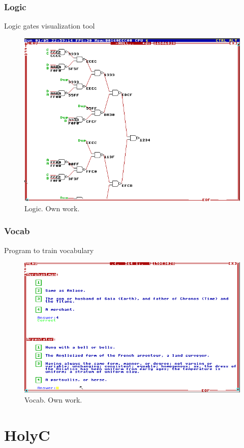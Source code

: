 \documentclass{beamer}
\begin{document}
	\begin{frame}
		\frametitle{Logic}
		Logic gates visualization tool
		\begin{figure}
			\centering
			\includegraphics[width=0.6\linewidth]{images/logic.png}
			\caption{Logic. Own work.}
			\label{fig:logic}
		\end{figure}
	\end{frame}

	\begin{frame}
		\frametitle{Vocab}
		Program to train vocabulary
		\begin{figure}
			\centering
			\includegraphics[width=0.6\linewidth]{images/vocab.png}
			\caption{Vocab. Own work.}
			\label{fig:vocab}
		\end{figure}
	\end{frame}

	\section{HolyC}
\end{document}
